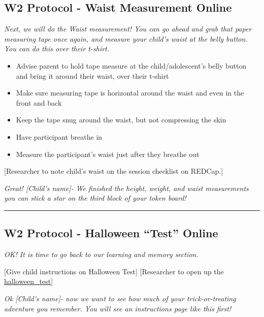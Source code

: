 \documentclass[
]{book}
\begin{document}
\hypertarget{w2-protocol---waist-measurement-online}{%
\subsection{W2 Protocol - Waist Measurement Online}\label{w2-protocol---waist-measurement-online}}

\emph{Next, we will do the Waist measurement! You can go ahead and grab that paper measuring tape once again, and measure your child's waist at the belly button. You can do this over their t-shirt.}

\begin{itemize}
\item
  Advise parent to hold tape measure at the child/adolescent's belly button and bring it around their waist, over their t-shirt
\item
  Make sure measuring tape is horizontal around the waist and even in the front and back
\item
  Keep the tape snug around the waist, but not compressing the skin
\item
  Have participant breathe in
\item
  Measure the participant's waist just after they breathe out
\end{itemize}

{[}Researcher to note child's waist on the session checklist on REDCap.{]}

\emph{Great! {[}Child's name{]}- We finished the height, weight, and waist measurements you can stick a star on the third block of your token board!}

\begin{center}\rule{0.5\linewidth}{0.5pt}\end{center}

\hypertarget{w2-protocol---halloween-test-online}{%
\subsection{W2 Protocol - Halloween ``Test'' Online}\label{w2-protocol---halloween-test-online}}

\emph{OK! It is time to go back to our learning and memory section.}

{[}Give child instructions on Halloween Test{]} {[}Researcher to open up the \href{https://app.box.com/file/784728666967}{halloween\_test}{]}

\emph{Ok {[}Child's name{]}- now we want to see how much of your trick-or-treating adventure you remember. You will see an instructions page like this first!}
\end{document}
